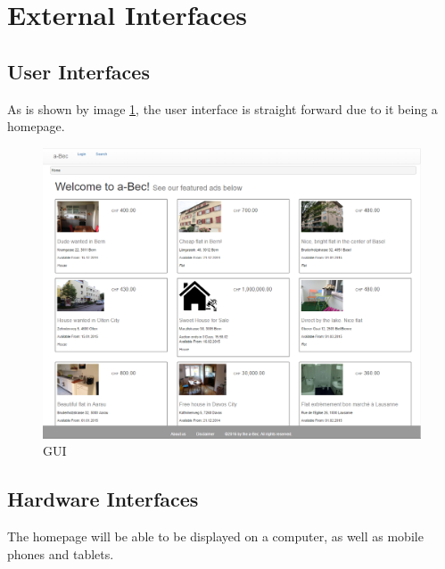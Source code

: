 \section{External Interfaces}

\subsection{User Interfaces}
	As is shown by image \ref{image-abecScreenshot}, the user interface is
	straight forward due to it being a homepage.
	
\begin{figure}[p]
    \centering
	\includegraphics[width=12cm]{images/abecScreenshot}
	\caption{GUI}
    \label{image-abecScreenshot}
\end{figure}
	
\subsection{Hardware Interfaces}
	The homepage will be able to be displayed on a computer, as well as mobile
	phones and tablets.
	